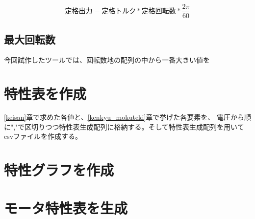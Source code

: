 \[  \mbox{定格出力} = \mbox{定格トルク} * \mbox{定格回転数} * \frac{2\pi}{60}　\]

\subsection{最大回転数}\label{sub:keisan_saidaikai}
今回試作したツールでは、回転数地の配列の中から一番大きい値を

\section{特性表を作成}\label{sakusei_hyou}
\ref{keisan}章で求めた各値と、\ref{kenkyu_mokuteki}章で挙げた各要素を、
電圧から順に","で区切りつつ特性表生成配列に格納する。そして特性表生成配列を用いてcsvファイルを作成する。


\section{特性グラフを作成}\label{sakusei_gura}


\section{モータ特性表を生成}\label{seisei_mort}


